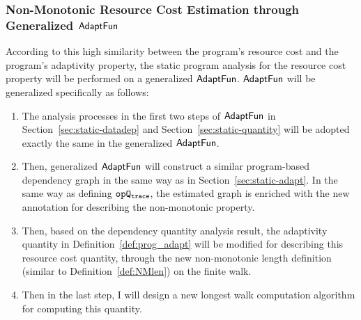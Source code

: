 \subsubsection{Non-Monotonic Resource Cost Estimation through Generalized $\textsf{AdaptFun}$}
According to this high similarity between the program's resource cost and the 
program's adaptivity property, the static program analysis for the resource cost property will 
be performed on a generalized $\textsf{AdaptFun}$. $\textsf{AdaptFun}$ will be generalized specifically as follows:
\begin{enumerate}
 \item The analysis processes in the first two steps of $\textsf{AdaptFun}$ in Section~\ref{sec:static-datadep}
 and Section~\ref{sec:static-quantity} will be adopted exactly the same in the generalized $\textsf{AdaptFun}$.
 \item Then, generalized $\textsf{AdaptFun}$ will construct a similar program-based dependency graph 
 in the same way as in Section~\ref{sec:static-adapt}. In the same way as defining $\mathtt{opQ_{trace}}$, 
 the estimated graph is enriched with the new annotation for describing the non-monotonic property.
 \item Then, based on the dependency quantity analysis result, the adaptivity quantity in Definition~\ref{def:prog_adapt}
 will be modified for describing this resource cost quantity, through the new non-monotonic length definition (similar to Definition~\ref{def:NMlen}) on the finite walk.
 \item Then in the last step, I will design a new longest walk computation algorithm for computing this quantity.
\end{enumerate}

